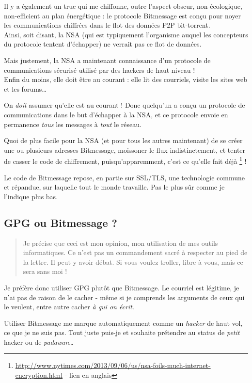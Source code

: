 Il y a également un truc qui me chiffonne, outre l'aspect obscur, non-écologique, non-efficient au plan énergétique : le protocole
Bitmessage est conçu pour noyer les communications chiffrées dans le flot des données P2P bit-torrent.\\Ainsi, soit disant, la NSA (qui est
typiquement l'organisme auquel les concepteurs du protocole tentent d'échapper) ne verrait pas ce flot de données.

Mais justement, la NSA a maintenant connaissance d'un protocole de communications sécurisé utilisé par des hackers de haut-niveau !\\Enfin
du moins, elle doit être au courant : elle lit des courriels, visite les sites web et les forums\ldots{}

On \emph{doit} assumer qu'elle est au courant ! Donc quelqu'un a conçu
un protocole de communications dans le but d'échapper à la NSA, et ce
protocole envoie en permanence \emph{tous} les messages à \emph{tout} le
réseau.

Quoi de plus facile pour la NSA (et pour tous les autres maintenant) de
se créer une ou plusieurs adresses Bitmessage, moissoner le flux
indistinctement, et tenter de casser le code de chiffrement,
puisqu'apparemment, c'est ce qu'elle fait déjà \footnote{\url{http://www.nytimes.com/2013/09/06/us/nsa-foils-much-internet-encryption.html} - lien en anglais} !

Le code de Bitmessage repose, en partie sur SSL/TLS, une technologie commune et répandue, sur laquelle tout le monde travaille. Pas le plus
sûr comme je l'indique plus bas.

\subsection{GPG ou Bitmessage ?}\label{gpg-ou-bitmessage}

\begin{quotation}
Je précise que ceci est mon opinion, mon utilisation de mes outils informatiques. Ce n'est pas un commandement sacré à respecter au pied de
la lettre. Il peut y avoir débat. Si vous voulez troller, libre à vous, mais ce sera sans moi !
\end{quotation}

Je préfère donc utiliser GPG plutôt que Bitmessage. Le courriel est
légitime, je n'ai pas de raison de le cacher - même si je comprends les
arguments de ceux qui le veulent, entre autre cacher \emph{à qui on écrit}.

Utiliser Bitmessage me marque automatiquement comme un \emph{hacker} de
haut vol, ce que je ne suis pas. Tout juste puis-je et souhaite
prétendre au status de \emph{petit} hacker ou de \emph{padawan}\ldots{}

